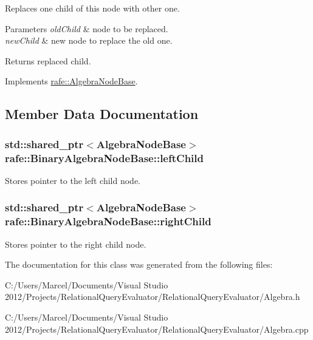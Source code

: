 Replaces one child of this node with other one. 
\begin{DoxyParams}{Parameters}
{\em old\+Child} & node to be replaced. \\
\hline
{\em new\+Child} & new node to replace the old one. \\
\hline
\end{DoxyParams}
\begin{DoxyReturn}{Returns}
replaced child. 
\end{DoxyReturn}


Implements \hyperlink{classrafe_1_1_algebra_node_base_ac6d722e739dd39c223bb129dfbd0ab45}{rafe\+::\+Algebra\+Node\+Base}.



\subsection{Member Data Documentation}
\hypertarget{classrafe_1_1_binary_algebra_node_base_af7380a182bdb21a519f3dd31ae189782}{
\subsubsection[{left\+Child}]{\setlength{\rightskip}{0pt plus 5cm}std\+::shared\+\_\+ptr$<${\bf Algebra\+Node\+Base}$>$ rafe\+::\+Binary\+Algebra\+Node\+Base\+::left\+Child}}\label{classrafe_1_1_binary_algebra_node_base_af7380a182bdb21a519f3dd31ae189782}
Stores pointer to the left child node. \hypertarget{classrafe_1_1_binary_algebra_node_base_a147cbdd038dcd2f2fc5240e4594b3597}{
\subsubsection[{right\+Child}]{\setlength{\rightskip}{0pt plus 5cm}std\+::shared\+\_\+ptr$<${\bf Algebra\+Node\+Base}$>$ rafe\+::\+Binary\+Algebra\+Node\+Base\+::right\+Child}}\label{classrafe_1_1_binary_algebra_node_base_a147cbdd038dcd2f2fc5240e4594b3597}
Stores pointer to the right child node. 

The documentation for this class was generated from the following files\+:\begin{DoxyCompactItemize}
\item 
C\+:/\+Users/\+Marcel/\+Documents/\+Visual Studio 2012/\+Projects/\+Relational\+Query\+Evaluator/\+Relational\+Query\+Evaluator/Algebra.\+h\item 
C\+:/\+Users/\+Marcel/\+Documents/\+Visual Studio 2012/\+Projects/\+Relational\+Query\+Evaluator/\+Relational\+Query\+Evaluator/Algebra.\+cpp\end{DoxyCompactItemize}
